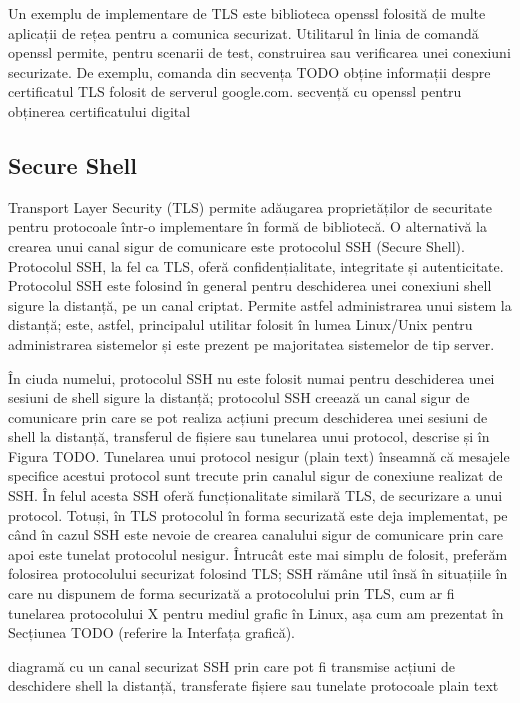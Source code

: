 Un exemplu de implementare de TLS este biblioteca openssl folosită de multe aplicații de rețea pentru a comunica securizat. Utilitarul în linia de comandă openssl permite, pentru scenarii de test, construirea sau verificarea unei conexiuni securizate. De exemplu, comanda din secvența TODO obține informații despre certificatul TLS folosit de serverul google.com.
secvență cu openssl pentru obținerea certificatului digital

\subsection{Secure Shell}
\label{sec:sec:ssh}

Transport Layer Security (TLS) permite adăugarea proprietăților de securitate pentru protocoale într-o implementare în formă de bibliotecă. O alternativă la crearea unui canal sigur de comunicare este protocolul SSH (Secure Shell). Protocolul SSH, la fel ca TLS, oferă confidențialitate, integritate și autenticitate. Protocolul SSH este folosind în general pentru deschiderea unei conexiuni shell sigure la distanță, pe un canal criptat. Permite astfel administrarea unui sistem la distanță; este, astfel, principalul utilitar folosit în lumea Linux/Unix pentru administrarea sistemelor și este prezent pe majoritatea sistemelor de tip server.

În ciuda numelui, protocolul SSH nu este folosit numai pentru deschiderea unei sesiuni de shell sigure la distanță; protocolul SSH creează un canal sigur de comunicare prin care se pot realiza acțiuni precum deschiderea unei sesiuni de shell la distanță, transferul de fișiere sau tunelarea unui protocol, descrise și în Figura TODO. Tunelarea unui protocol nesigur (plain text) înseamnă că mesajele specifice acestui protocol sunt trecute prin canalul sigur de conexiune realizat de SSH. În felul acesta SSH oferă funcționalitate similară TLS, de securizare a unui protocol. Totuși, în TLS protocolul în forma securizată este deja implementat, pe când în cazul SSH este nevoie de crearea canalului sigur de comunicare prin care apoi este tunelat protocolul nesigur. Întrucât este mai simplu de folosit, preferăm folosirea protocolului securizat folosind TLS; SSH rămâne util însă în situațiile în care nu dispunem de forma securizată a protocolului prin TLS, cum ar fi tunelarea protocolului X pentru mediul grafic în Linux, așa cum am prezentat în Secțiunea TODO (referire la Interfața grafică).

diagramă cu un canal securizat SSH prin care pot fi transmise acțiuni de deschidere shell la distanță, transferate fișiere sau tunelate protocoale plain text

